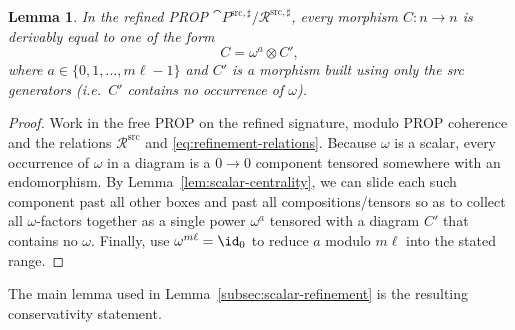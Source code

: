 \documentclass[10pt,a4paper]{article}
\newtheorem{lemma}[theorem]{Lemma}
\def\cref#1{Lemma~\ref{#1}}%
\begin{document}
\begin{lemma}\label{lem:scalar-extraction}
In the refined PROP $\cat{P}^{\mathrm{src},\sharp}/\mathcal{R}^{\mathrm{src},\sharp}$,
every morphism $C:n\to n$ is derivably equal to one of the form
\begin{equation}\label{eq:scalar-normal-form}
  C = \omega^{a}\otimes C',
\end{equation}
where $a\in\{0,1,\dots,m\ell-1\}$ and $C'$ is a morphism built using only the
\emph{src} generators (i.e.\ $C'$ contains no occurrence of $\omega$).
\end{lemma}
\begin{proof}
Work in the free PROP on the refined signature, modulo PROP coherence and the relations
$\mathcal{R}^{\mathrm{src}}$ and \eqref{eq:refinement-relations}.  Because $\omega$ is a scalar,
every occurrence of $\omega$ in a diagram is a $0\to 0$ component tensored somewhere with an
endomorphism.  By \cref{lem:scalar-centrality}, we can slide each such component past all other
boxes and past all compositions/tensors so as to collect all $\omega$-factors together as a single
power $\omega^{a}$ tensored with a diagram $C'$ that contains no $\omega$.
Finally, use $\omega^{m\ell}=\id_0$ to reduce $a$ modulo $m\ell$ into the stated range.
\end{proof}


The main lemma used in \cref{subsec:scalar-refinement} is the resulting conservativity statement.
\end{document}
